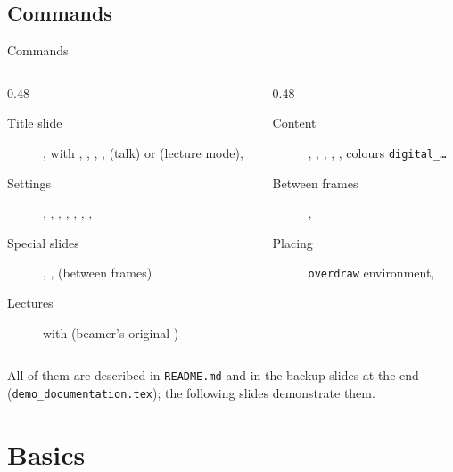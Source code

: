 \subsection{Commands}
\begin{frame}{Commands}
	\beamerdefaultoverlayspecification{}%
	\scriptsize
	\begin{columns}[T]
		\begin{column}{0.48\textwidth}
			\begin{description}
				\item[Title slide] ,  with , , , ,  (talk) or  (lecture mode), 
				\item[Settings] , , , , , , , 
				\item[Special slides] , ,  (between frames)
				\item[Lectures]  with  (beamer's original )
			\end{description}
		\end{column}
		\begin{column}{0.48\textwidth}
			\begin{description}
				\item[Content] , , , , , colours \texttt{digital\_\dots}
				\item[Between frames] , 
				\item[Placing] \texttt{overdraw} environment, 
			\end{description}
		\end{column}
	\end{columns}
	\medskip
	All of them are described in \texttt{README.md} and in the backup slides at the end (\texttt{demo\_documentation.tex}); the following slides demonstrate them.
\end{frame}
%
%
\section{Basics}
